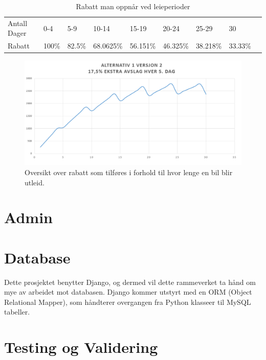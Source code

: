 \begin{table}[htbp]
\centering
\caption{Rabatt man oppnår ved leieperioder}
\label{table:percent}
\begin{tabular}{|l|l|l|l|l|l|l|l|l}
\cline{1-8}
Antall Dager & 0-4   & 5-9    & 10-14     & 15-19    & 20-24    & 25-29    & 30      &  \\ \cline{1-8}
Rabatt       & 100\% & 82.5\% & 68.0625\% & 56.151\% & 46.325\% & 38.218\% & 33.33\% &  \\ \cline{1-8}
\end{tabular}
\end{table}



 \begin{figure}[htbp]
	\centering
		\includegraphics[scale=0.5]{Bilder/avslag.png}
	\caption[Utleiepris Diagram]{Oversikt over rabatt som tilføres i forhold til hvor lenge en bil blir utleid. } %
	\label{fig:price_reduction}
\end{figure}


\clearpage
\section{Admin}

\clearpage
\section{Database}
Dette prosjektet benytter Django, og dermed vil dette rammeverket ta hånd om mye av arbeidet mot databasen. Django kommer utstyrt med en ORM (Object Relational Mapper), som håndterer overgangen fra Python klasseer til MySQL tabeller. 

\clearpage
\section{Testing og Validering}



